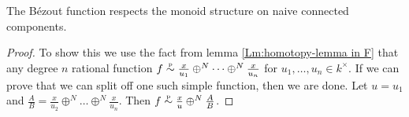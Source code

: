 % 
%
%

\begin{lemma}\label{lm:Bez respects monoid structure}
The Bézout function respects the monoid structure on naive connected components. 

\begin{proof}

To show this we use the fact from lemma  \ref{Lm:homotopy-lemma in F} that any degree \(n\) rational function \(f \htpy \frac{x}{u_1}\oplus^N \dots \oplus^N \frac{x}{u_n}\) for \(u_1,\dots , u_n \in k^{\times}\).  
%
If we can prove that we can split off one such simple function, then we are done. Let \(u = u_1\) and \(\frac{A}{B}= \frac{x}{u_2}\oplus^N \dots \oplus^N \frac{x}{u_n}\). Then \(f \htpy \frac{x}{u} \oplus^{N} \frac{A}{B}\).


\end{proof}
\end{lemma}
